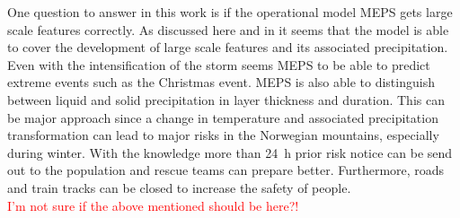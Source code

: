 \noindent
One question to answer in this work is if the operational model MEPS gets large scale features correctly. As discussed here and in  it seems that the model is able to cover the development of large scale features and its associated precipitation. Even with the intensification of the storm seems MEPS to be able to predict extreme events such as the Christmas event. 
MEPS is also able to distinguish between liquid and solid precipitation in layer thickness and duration. This can be major approach since a change in temperature and associated precipitation transformation can lead to major risks in the Norwegian mountains, especially during winter. With the knowledge more than \SI{24}{\hour} prior risk notice can be send out to the population and rescue teams can prepare better. Furthermore, roads and train tracks can be closed to increase the safety of people.
\\
\textcolor{red}{I'm not sure if the above mentioned should be here?! }

